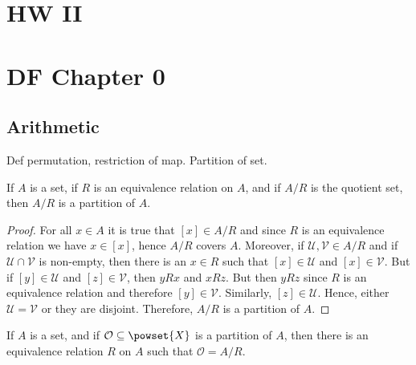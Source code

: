 \documentclass{article}                                                        %
\begin{document}
    \section{HW II}

    \section{DF Chapter 0}
        \subsection{Arithmetic}
            Def permutation, restriction of map. Partition of set.
            \begin{theorem}
                \label{thm:Equiv_Classes_Form_Partition}%
                If $A$ is a set, if $R$ is an equivalence relation on $A$, and
                if $A/R$ is the quotient set, then $A/R$ is a partition of $A$.
            \end{theorem}
            \begin{proof}
                For all $x\in{A}$ it is true that $[x]\in{A}/R$ and since $R$ is
                an equivalence relation we have $x\in[x]$, hence $A/R$ covers
                $A$. Moreover, if $\mathcal{U},\mathcal{V}\in{A}/R$ and if
                $\mathcal{U}\cap\mathcal{V}$ is non-empty, then there is an
                $x\in{R}$ such that $[x]\in\mathcal{U}$ and $[x]\in\mathcal{V}$.
                But if $[y]\in\mathcal{U}$ and $[z]\in\mathcal{V}$, then
                $yRx$ and $xRz$. But then $yRz$ since $R$ is an equivalence
                relation and therefore $[y]\in\mathcal{V}$. Similarly,
                $[z]\in\mathcal{U}$. Hence, either $\mathcal{U}=\mathcal{V}$ or
                they are disjoint. Therefore, $A/R$ is a partition of $A$.
            \end{proof}
            \begin{theorem}
                If $A$ is a set, and if $\mathcal{O}\subseteq\powset{X}$ is a
                partition of $A$, then there is an equivalence relation $R$ on
                $A$ such that $\mathcal{O}=A/R$.
            \end{theorem}
\end{document}

